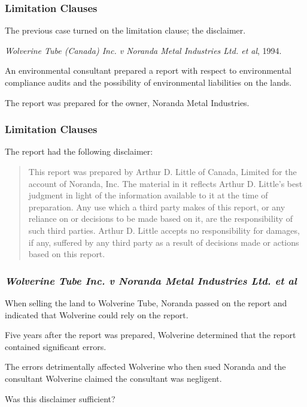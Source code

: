 \begin{frame}
\frametitle{Limitation Clauses}

The previous case turned on the limitation clause; the disclaimer.

\textit{Wolverine Tube (Canada) Inc. v Noranda Metal Industries Ltd. et al}, 1994.

An environmental consultant prepared a report with respect to environmental compliance audits and the possibility of environmental liabilities on the lands.

The report was prepared for the owner, Noranda Metal Industries.

\end{frame}



\begin{frame}
\frametitle{Limitation Clauses}

The report had the following disclaimer:

\begin{quote}
This report was prepared by Arthur D. Little of Canada, Limited for the account of Noranda, Inc. The material in it reflects Arthur D. Little's best judgment in light of the information available to it at the time of preparation. Any use which a third party makes of this report, or any reliance on or decisions to be made based on it, are the responsibility of such third parties. Arthur D. Little accepts no responsibility for damages, if any, suffered by any third party as a result of decisions made or actions based on this report.
\end{quote}


\end{frame}



\begin{frame}
\frametitle{\textit{Wolverine Tube Inc. v Noranda Metal Industries Ltd. et al}}

When selling the land to Wolverine Tube, Noranda passed on the report and indicated that Wolverine could rely on the report.

Five years after the report was prepared, Wolverine determined that the report contained significant errors.

The errors detrimentally affected Wolverine who then sued Noranda and the consultant
Wolverine claimed the consultant was negligent.

Was this disclaimer sufficient?

\end{frame}



